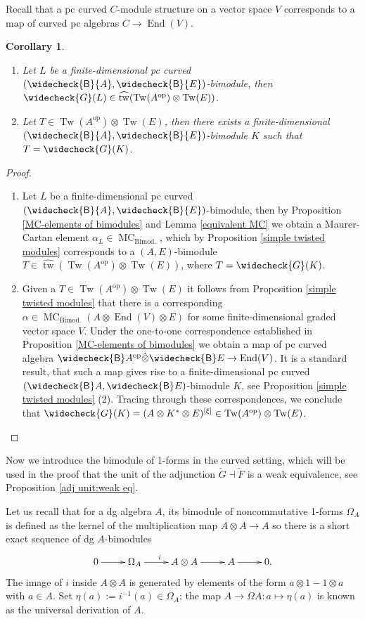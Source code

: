 \documentclass[a4paper]{amsart}
\theoremstyle{plain}
\newtheorem{cor}[thm]{Corollary}
\theoremstyle{definition}
\theoremstyle{remark}
\DeclareMathOperator{\End}{End}
\DeclareMathOperator{\MC}{MC}
\DeclareMathOperator{\tw}{tw}
\DeclareMathOperator{\Tw}{Tw}
\newcommand{\op}{\mathrm{op}}
\newcommand{\cB}{\widecheck{\mathsf{B}}}
\numberwithin{equation}{section}
\theoremstyle{plain}
\begin{document}
	Recall that a pc curved $C$-module structure on a vector space $V$ corresponds to a map of curved pc algebras $C\to \End(V)$. 
	\begin{cor}\label{MC-elements and twisted modules}
		\begin{enumerate}
			\item Let $L$ be a finite-dimensional pc curved $(\cB{A},\cB{E})$-bimodule, then $\widecheck{G}(L)\in \widehat{\tw}(\Tw(A^\op)\otimes \Tw(E))$.
			\item Let $T\in \Tw(A^\op)\otimes \Tw(E)$, then there exists a finite-dimensional  $(\cB{A},\cB{E})$-bimodule $K$ such that $T=\widecheck{G}(K)$.
		\end{enumerate}
	\end{cor}
	\begin{proof}
		\begin{enumerate}
			\item Let $L$ be a finite-dimensional pc curved $(\cB{A},\cB{E})$-bimodule, then by Proposition \ref{MC-elements of bimodules} and Lemma \ref{equivalent MC} we obtain a Maurer-Cartan element $\alpha_L\in \MC_\text{Bimod.}$, which by Proposition \ref{simple twisted modules} corresponds to a $(A,E)$-bimodule $T\in \widehat{\tw}(\Tw(A^\op)\otimes \Tw(E))$, where $T=\widecheck{G}(K)$.
			\item Given a $T\in \Tw(A^\op)\otimes \Tw(E)$ it follows from Proposition \ref{simple twisted modules} that there is a corresponding $\alpha \in \MC_\text{Bimod.}(A\otimes \End(V)\otimes E)$ for some finite-dimensional graded vector space $V$. Under the one-to-one correspondence established in Proposition \ref{MC-elements of bimodules} we obtain a map of pc curved algebra
			$\cB A^\op\hat{\otimes}\cB E\to \End(V)$. It is a standard result, that such a map gives rise to a finite-dimensional pc curved $(\cB A,\cB E)$-bimodule $K$, 
			see Proposition \ref{simple twisted modules} (2). Tracing through these correspondences, we conclude that $	\widecheck{G}(K)=(A\otimes K^\ast\otimes E)^{[\xi]}\in \Tw(A^\op)\otimes \Tw(E)$.
		\end{enumerate}
	\end{proof}
Now we introduce the bimodule of 1-forms in the curved setting, which will be used in the proof that the unit of the adjunction $\check G \dashv \check F$ is a weak equivalence, see Proposition \ref{adj unit:weak eq}.

Let us recall that for a dg algebra $A$, its  bimodule of noncommutative 1-forms $\Omega_A$ is defined as the kernel of the multiplication map $A\otimes A\to A$ so there is a short exact sequence of dg $A$-bimodules
\begin{equation}\label{eq:noncommdiff}\xymatrix{
		0\ar[r]&\Omega_A\ar^i[r]&A\otimes A\ar[r]&A\ar[r]&0.
	}
\end{equation}
The image of $i$ inside $A\otimes A$ is generated by elements of the form $a\otimes 1-1\otimes a$ with $a\in A$. Set $\eta(a):=i^{-1}(a)\in \Omega_A$; the map $A\to \Omega A:a\mapsto \eta(a)$ is known as the universal derivation of $A$.
\end{document}
